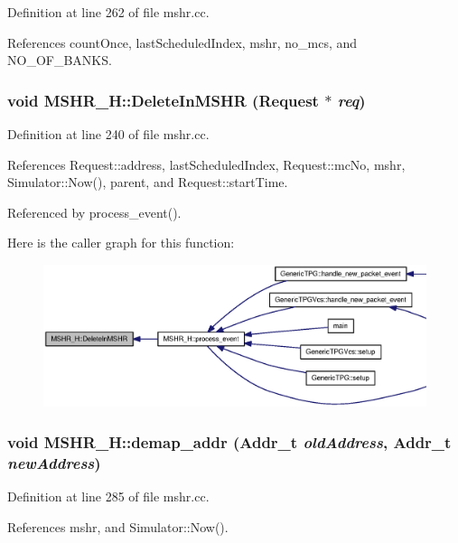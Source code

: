 Definition at line 262 of file mshr.cc.

References countOnce, lastScheduledIndex, mshr, no\_\-mcs, and NO\_\-OF\_\-BANKS.
\subsubsection[{DeleteInMSHR}]{\setlength{\rightskip}{0pt plus 5cm}void MSHR\_\-H::DeleteInMSHR ({\bf Request} $\ast$ {\em req})}\label{classMSHR__H_11c3517e46d1f3dfc36ab540939ae3dd}




Definition at line 240 of file mshr.cc.

References Request::address, lastScheduledIndex, Request::mcNo, mshr, Simulator::Now(), parent, and Request::startTime.

Referenced by process\_\-event().

Here is the caller graph for this function:\nopagebreak
\begin{figure}[H]
\begin{center}
\leavevmode
\includegraphics[width=385pt]{classMSHR__H_11c3517e46d1f3dfc36ab540939ae3dd_icgraph}
\end{center}
\end{figure}
\subsubsection[{demap\_\-addr}]{\setlength{\rightskip}{0pt plus 5cm}void MSHR\_\-H::demap\_\-addr ({\bf Addr\_\-t} {\em oldAddress}, \/  {\bf Addr\_\-t} {\em newAddress})}\label{classMSHR__H_d0214a2b87adc1e701052c2f4abe759f}




Definition at line 285 of file mshr.cc.

References mshr, and Simulator::Now().
